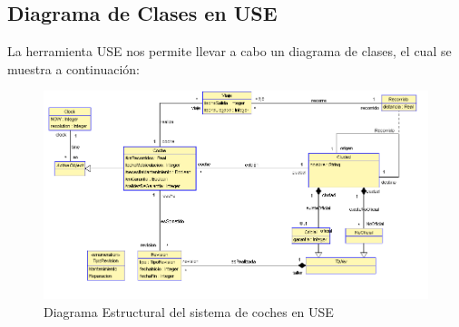 \documentclass[12pt.a4paper]{article}
\begin{document}
\subsection{Diagrama de Clases en USE}
La herramienta USE nos permite llevar a cabo un diagrama de clases, el cual se muestra a continuación:
\begin{figure}[H]
     \includegraphics[width=1\linewidth]{diagramas/USE_A.png}
     \caption{Diagrama Estructural del sistema de coches en USE}
    \end{figure}
\vspace{1.0cm}
\end{document}
